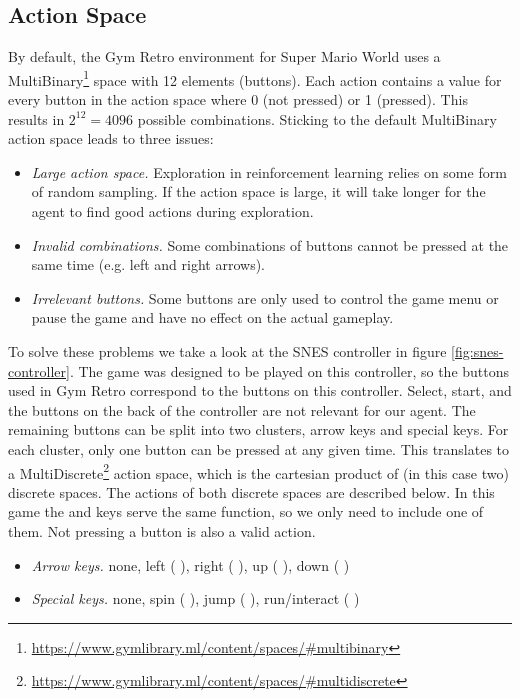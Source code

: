 \documentclass{article}
\newcommand*{\img}[1]{%
    \raisebox{-.25\baselineskip}{%
        \texttt{[image: \#1]}%
    }%
}
\begin{document}
\subsection{Action Space}
By default, the Gym Retro environment for Super Mario World uses a MultiBinary\footnote{\url{https://www.gymlibrary.ml/content/spaces/\#multibinary}} space with 12 elements (buttons).
Each action contains a value for every button in the action space where 0 (not pressed) or 1 (pressed). This results in $2^{12}=4096$ possible combinations.
Sticking to the default MultiBinary action space leads to three issues:
\begin{itemize}
    \item \emph{Large action space.}
        Exploration in reinforcement learning relies on some form of random sampling.
        If the action space is large, it will take longer for the agent to find good actions during exploration.
    \item \emph{Invalid combinations.}
        Some combinations of buttons cannot be pressed at the same time (e.g. left and right arrows).
    \item \emph{Irrelevant buttons.} Some buttons are only used to control the game menu or pause the game and have no effect on the actual gameplay.
\end{itemize}
To solve these problems we take a look at the SNES controller in figure \ref{fig:snes-controller}.
The game was designed to be played on this controller, so the buttons used in Gym Retro correspond to the buttons on this controller.
Select, start, and the buttons on the back of the controller are not relevant for our agent.
The remaining buttons can be split into two clusters, arrow keys and special keys.
For each cluster, only one button can be pressed at any given time.
This translates to a MultiDiscrete\footnote{\url{https://www.gymlibrary.ml/content/spaces/\#multidiscrete}} action space, which is the cartesian product of (in this case two) discrete spaces.
The actions of both discrete spaces are described below.
In this game the \img{SuperNintendo-Button-X} and \img{SuperNintendo-Button-Y} keys serve the same function, so we only need to include one of them.
Not pressing a button is also a valid action.
\begin{itemize}
    \item \emph{Arrow keys.} none, left (\img{SuperNintendo-Dpad-Left}), right (\img{SuperNintendo-Dpad-Right}), up (\img{SuperNintendo-Dpad-Up}), down (\img{SuperNintendo-Dpad-Down})
    \item \emph{Special keys.} none, spin (\img{SuperNintendo-Button-A}), jump (\img{SuperNintendo-Button-B}), run/interact (\img{SuperNintendo-Button-X})
\end{itemize}
\end{document}
